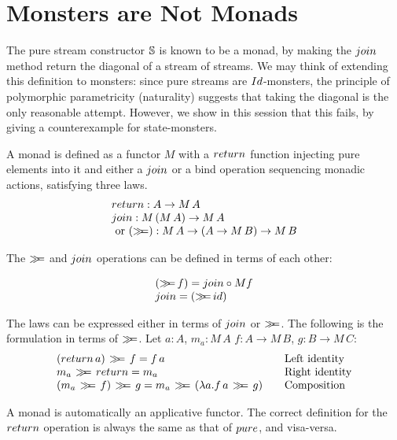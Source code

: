 \section{Monsters are Not Monads}\label{sec:monad}

The pure stream constructor $\mathbb{S}$ is known to be a monad, by making the $\join$ method return the diagonal of a stream of streams.
We may think of extending this definition to monsters: since pure streams are $\Id$-monsters, the principle of polymorphic parametricity (naturality) suggests that taking the diagonal is the only reasonable attempt.
However, we show in this session that this fails, by giving a counterexample for state-monsters.

A monad is defined as a functor $M$ with a $\return$ function injecting pure elements into it and either a $\join$ or a bind operation sequencing monadic actions, satisfying three laws.
$$
\begin{array}{l}
\return : A \rightarrow M\, A \\
\join : M\,(M\, A) \rightarrow M\, A\\
\mbox{ or }
(\bind) : M\, A \rightarrow (A \rightarrow M\, B) \rightarrow M\, B
\end{array}
$$

The $\mathbin{\gg\!\!=}$ and $\join$ operations can be defined in terms of each other:

$$
\begin{array}{l}
(\bind\, f) = \join \comp M f \\
\join = (\bind\,\id)
\end{array}
$$

The laws can be expressed either in terms of $\join$ or $\mathbin{\gg\!\!=}$.
The following is the formulation in terms of $\mathbin{\gg\!\!=}$.
Let $a:A$, $m_a : M\, A$
$f : A \rightarrow M\, B$, $g : B \rightarrow M\,C$:
$$
\begin{array}{l@{\qquad}l}
(\return\, a)\, \bind \, f = f\, a
  & \mbox{Left identity} \\
m_a\, \bind \, \return = m_a
  & \mbox{Right identity} \\
(m_a \, \bind \, f)\, \bind \, g = m_a\, \bind\, (\lambda a.  f\, a \, \bind \, g)
  & \mbox{Composition} \\
\end{array}
$$







A monad is automatically an applicative functor. 
The correct definition for the $\return$ operation is always the same as that of $\apure$, and visa-versa. \\



